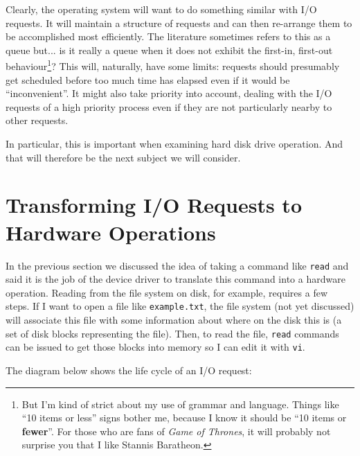 Clearly, the operating system will want to do something similar with I/O requests. It will maintain a structure of requests and can then re-arrange them to be accomplished most efficiently. The literature sometimes refers to this as a queue but... is it really a queue when it does not exhibit the first-in, first-out behaviour\footnote{But I'm kind of strict about my use of grammar and language. Things like ``10 items or less'' signs bother me, because I know it should be ``10 items or \textbf{fewer}''. For those who are fans of \textit{Game of Thrones}, it will probably not surprise you that I like Stannis Baratheon.}? This will, naturally, have some limits: requests should presumably get scheduled before too much time has elapsed even if it would be ``inconvenient''. It might also take priority into account, dealing with the I/O requests of a high priority process even if they are not particularly nearby to other requests. 

In particular, this is important when examining hard disk drive operation. And that will therefore be the next subject we will consider.

\section*{Transforming I/O Requests to Hardware Operations}

In the previous section we discussed the idea of taking a command like \texttt{read} and said it is the job of the device driver to translate this command into a hardware operation. Reading from the file system on disk, for example, requires a few steps. If I want to open a file like \texttt{example.txt}, the file system (not yet discussed) will associate this file with some information about where on the disk this is (a set of disk blocks representing the file). Then, to read the file, \texttt{read} commands can be issued to get those blocks into memory so I can edit it with \texttt{vi}.

The diagram below shows the life cycle of an I/O request:


